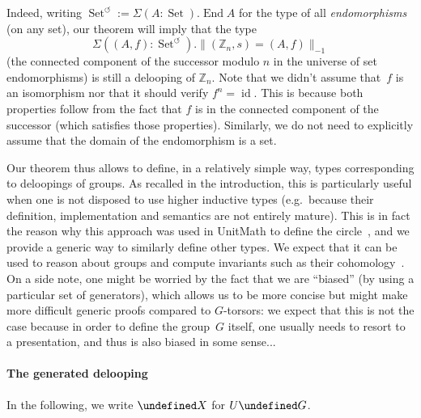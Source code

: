 \documentclass[10pt,a4paper]{amsart}
\theoremstyle{definition}
\newcommand{\Z}{\mathbb{Z}} %
\newcommand{\id}{\operatorname{id}} %
\newcommand{\trunc}[2]{\|#2\|_{#1}} %
\newcommand{\ptrunc}[1]{\trunc{-1}{#1}} %
\newcommand{\defd}{:=} %
\newcommand{\End}{\operatorname{End}} %
\let\P\undefined
\newcommand{\P}[1]{\operatorname{P}_{#1}} %
\newcommand{\SetEnd}{\Set^{\circlearrowleft}} %
\newcommand{\Set}{\operatorname{Set}} %
\newcommand{\eg}{e.g.~}
\begin{document}
Indeed, writing
$
  \SetEnd
  \defd
  \Sigma(A:\Set).\End A
$
for the type of all \emph{endomorphisms} (on any set), our theorem will imply
that the type
\begin{equation}
  \label{Zn-delooping}
  \Sigma((A,f):\SetEnd).\ptrunc{(\Z_n,s)=(A,f)}
\end{equation}
(the connected component of the successor modulo $n$ in the universe of set
endomorphisms) is still a delooping of $\Z_n$. Note that we didn't assume
that~$f$ is an isomorphism nor that it should verify $f^n=\id$. This is because
both properties follow from the fact that $f$ is in the connected component of
the successor (which satisfies those properties). Similarly, we do not need to
explicitly assume that the domain of the endomorphism is a set.

Our theorem thus allows to define, in a relatively simple way, types
corresponding to deloopings of groups. As recalled in the introduction, this is
particularly useful when one is not disposed to use higher inductive types
(\eg because their definition, implementation and semantics are not entirely
mature). This is in fact the reason why this approach was used in UnitMath to
define the circle~\cite{bezem2021construction}, and we provide a generic way to
similarly define other types.
%
We expect that it can be used to reason about groups and compute invariants such as their cohomology~\cite{cavallo2015synthetic,buchholtz2020cellular,brunerie2022synthetic}.
%
On a side note, one might be worried by the fact that we are ``biased'' (by
using a particular set of generators), which allows us to be more concise but
might make more difficult generic proofs compared to $G$-torsors: we expect that
this is not the case because in order to define the group~$G$ itself, one
usually needs to resort to a presentation, and thus is also biased in some sense...

\paragraph{The generated delooping}
In the following, we write $\P X$ for $U\P G$.
\end{document}
